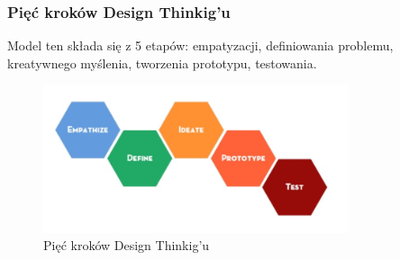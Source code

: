 \documentclass[a4paper,titleauthor]{mwart}
\begin{document}
 \subsubsection{Pięć kroków Design Thinkig'u}
 Model ten składa się z 5 etapów: empatyzacji, definiowania problemu, kreatywnego myślenia, tworzenia prototypu, testowania.
\begin{figure}[h]
 	\centering
 	\includegraphics[width=0.8\textwidth]{5krokow.PNG}
 	\caption{Pięć kroków Design Thinkig'u}
 \end{figure}
\end{document}
